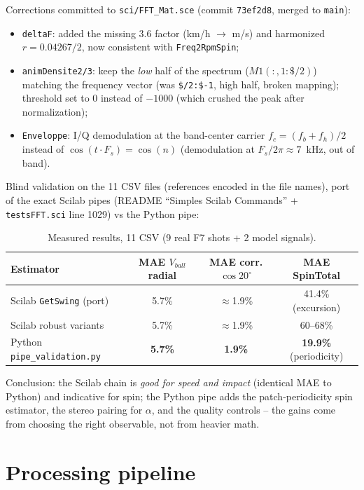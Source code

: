 \documentclass[10pt,a4paper]{report}
\begin{document}
Corrections committed to \texttt{sci/FFT\_Mat.sce} (commit \texttt{73ef2d8}, merged to \texttt{main}):
\begin{itemize}
  \item \texttt{deltaF}: added the missing $3.6$ factor (km/h $\to$ m/s) and harmonized $r=0.04267/2$, now consistent with \texttt{Freq2RpmSpin};
  \item \texttt{animDensite2/3}: keep the \emph{low} half of the spectrum ($M1(:,1:\$/2)$) matching the frequency vector (was \texttt{\$/2:\$-1}, high half, broken mapping); threshold set to 0 instead of $-1000$ (which crushed the peak after normalization);
  \item \texttt{Enveloppe}: I/Q demodulation at the band-center carrier $f_c=(f_b+f_h)/2$ instead of $\cos(t\cdot F_s)=\cos(n)$ (demodulation at $F_s/2\pi\approx 7$~kHz, out of band).
\end{itemize}

Blind validation on the 11 CSV files (references encoded in the file names), port of the exact Scilab pipes (README ``Simples Scilab Commands'' + \texttt{testsFFT.sci} line 1029) vs the Python pipe:

\begin{table}[H]\centering
\caption{Measured results, 11 CSV (9 real F7 shots + 2 model signals).}
\label{tab:scilabvspython}
\small
\begin{tabular}{|l|c|c|c|}
\hline
Estimator & MAE $V_{ball}$ radial & MAE corr. $\cos20^\circ$ & MAE SpinTotal \\ \hline
Scilab \texttt{GetSwing} (port) & 5.7\% & $\approx$1.9\% & 41.4\% (excursion) \\
Scilab robust variants & 5.7\% & $\approx$1.9\% & 60--68\% \\
Python \texttt{pipe\_validation.py} & \textbf{5.7\%} & \textbf{1.9\%} & \textbf{19.9\%} (periodicity) \\ \hline
\end{tabular}
\end{table}

Conclusion: the Scilab chain is \emph{good for speed and impact} (identical MAE to Python) and indicative for spin; the Python pipe adds the patch-periodicity spin estimator, the stereo pairing for $\alpha$, and the quality controls -- the gains come from choosing the right observable, not from heavier math.

\section{Processing pipeline}
\end{document}
